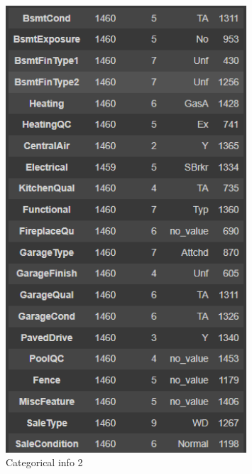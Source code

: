 \begin{figure}[h!]
    \centering
    \includegraphics[width=0.8\textwidth]{imgs/info4.png}
    \caption{Categorical info 2}
    \label{fig:info4}
\end{figure}
